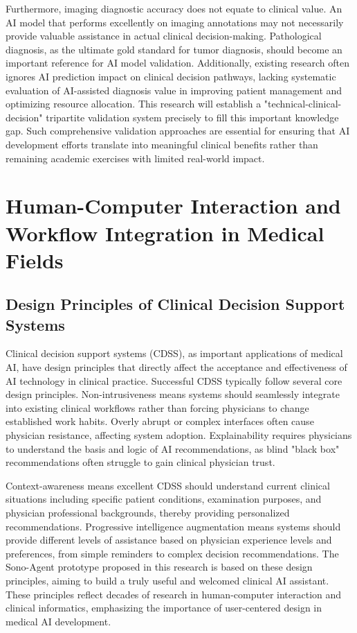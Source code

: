 Furthermore, imaging diagnostic accuracy does not equate to clinical value. An AI model that performs excellently on imaging annotations may not necessarily provide valuable assistance in actual clinical decision-making. Pathological diagnosis, as the ultimate gold standard for tumor diagnosis, should become an important reference for AI model validation. Additionally, existing research often ignores AI prediction impact on clinical decision pathways, lacking systematic evaluation of AI-assisted diagnosis value in improving patient management and optimizing resource allocation. This research will establish a "technical-clinical-decision" tripartite validation system precisely to fill this important knowledge gap. Such comprehensive validation approaches are essential for ensuring that AI development efforts translate into meaningful clinical benefits rather than remaining academic exercises with limited real-world impact.

\section{Human-Computer Interaction and Workflow Integration in Medical Fields}

\subsection{Design Principles of Clinical Decision Support Systems}

Clinical decision support systems (CDSS), as important applications of medical AI, have design principles that directly affect the acceptance and effectiveness of AI technology in clinical practice. Successful CDSS typically follow several core design principles. Non-intrusiveness means systems should seamlessly integrate into existing clinical workflows rather than forcing physicians to change established work habits. Overly abrupt or complex interfaces often cause physician resistance, affecting system adoption. Explainability requires physicians to understand the basis and logic of AI recommendations, as blind "black box" recommendations often struggle to gain clinical physician trust.

Context-awareness means excellent CDSS should understand current clinical situations including specific patient conditions, examination purposes, and physician professional backgrounds, thereby providing personalized recommendations. Progressive intelligence augmentation means systems should provide different levels of assistance based on physician experience levels and preferences, from simple reminders to complex decision recommendations. The Sono-Agent prototype proposed in this research is based on these design principles, aiming to build a truly useful and welcomed clinical AI assistant. These principles reflect decades of research in human-computer interaction and clinical informatics, emphasizing the importance of user-centered design in medical AI development.

